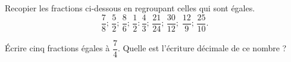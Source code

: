 
\begin{exercice}\label{exosmath-0798}



Recopier les fractions ci-dessous en regroupant celles qui sont égales.
\begin{equation}
    \dfrac{ 7 }{ 8 };\,\dfrac{ 5 }{ 2 };\,\dfrac{ 8 }{ 6 };\,\dfrac{ 1 }{ 2 }:\dfrac{ 4 }{ 3 };\,\dfrac{ 21 }{ 24 };\,\dfrac{ 30 }{ 12 };\;\dfrac{ 12 }{ 9 };\,\dfrac{ 25 }{ 10 }.
\end{equation}

Écrire cinq fractions égales à \( \dfrac{ 7 }{ 4 }\). Quelle est l'écriture décimale de ce nombre ?

\end{exercice}
